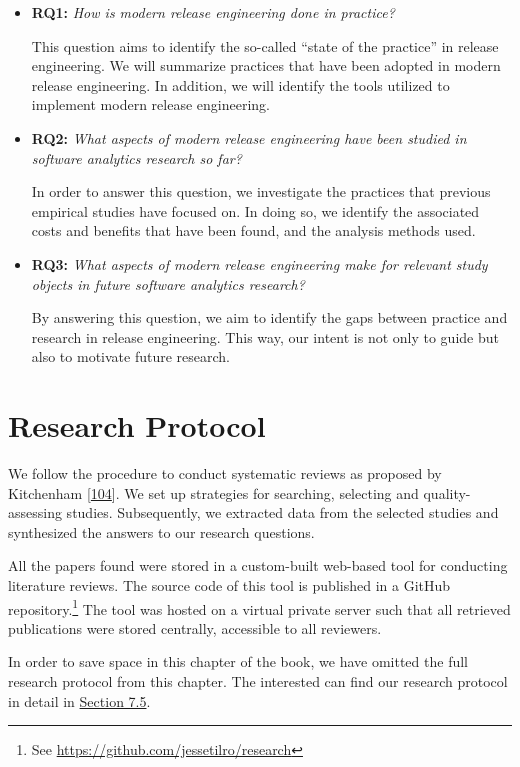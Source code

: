 \documentclass[]{book}
\let\rmarkdownfootnote\footnote%
\def\footnote{\protect\rmarkdownfootnote}
\begin{document}
\begin{itemize}
\item
  \textbf{RQ1:} \emph{How is modern release engineering done in
  practice?}

  This question aims to identify the so-called ``state of the practice''
  in release engineering. We will summarize practices that have been
  adopted in modern release engineering. In addition, we will identify
  the tools utilized to implement modern release engineering.
\item
  \textbf{RQ2:} \emph{What aspects of modern release engineering have
  been studied in software analytics research so far?}

  In order to answer this question, we investigate the practices that
  previous empirical studies have focused on. In doing so, we identify
  the associated costs and benefits that have been found, and the
  analysis methods used.
\item
  \textbf{RQ3:} \emph{What aspects of modern release engineering make
  for relevant study objects in future software analytics research?}

  By answering this question, we aim to identify the gaps between
  practice and research in release engineering. This way, our intent is
  not only to guide but also to motivate future research.
\end{itemize}

\section{Research Protocol}\label{research-protocol-3}

We follow the procedure to conduct systematic reviews as proposed by
Kitchenham {[}\protect\hyperlink{ref-kitchenham2004procedures}{104}{]}.
We set up strategies for searching, selecting and quality-assessing
studies. Subsequently, we extracted data from the selected studies and
synthesized the answers to our research questions.

All the papers found were stored in a custom-built web-based tool for
conducting literature reviews. The source code of this tool is published
in a GitHub repository.\footnote{See
  \url{https://github.com/jessetilro/research}} The tool was hosted on a
virtual private server such that all retrieved publications were stored
centrally, accessible to all reviewers.

In order to save space in this chapter of the book, we have omitted the
full research protocol from this chapter. The interested can find our
research protocol in detail in \protect\hyperlink{appendix}{Section
7.5}.
\end{document}
